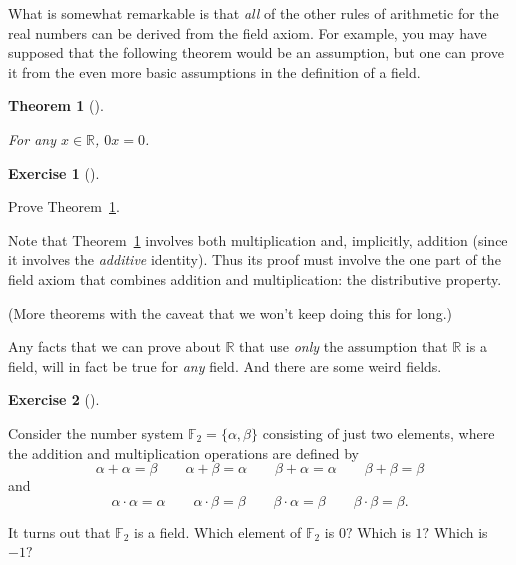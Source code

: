 \documentclass[
  letterpaper,
  DIV=11,
  numbers=noendperiod]{scrreprt}
\def\R{\mathbb R}
\theoremstyle{plain}
\newtheorem{theorem}{Theorem}[chapter]
\theoremstyle{definition}
\newtheorem{exercise}{Exercise}[chapter]
\theoremstyle{plain}
\theoremstyle{plain}
\theoremstyle{definition}
\theoremstyle{definition}
\theoremstyle{remark}
\begin{document}
What is somewhat remarkable is that \emph{all} of the other rules of
arithmetic for the real numbers can be derived from the field axiom. For
example, you may have supposed that the following theorem would be an
assumption, but one can prove it from the even more basic assumptions in
the definition of a field.

\begin{theorem}[]\protect\hypertarget{thm-zero-times-x}{}\label{thm-zero-times-x}

For any \(x\in\R\), \(0x=0\).

\end{theorem}

\begin{exercise}[]\protect\hypertarget{exr-zero-times-x}{}\label{exr-zero-times-x}

Prove Theorem~\ref{thm-zero-times-x}.

\end{exercise}

\begin{tcolorbox}[enhanced jigsaw, titlerule=0mm, opacitybacktitle=0.6, leftrule=.75mm, bottomrule=.15mm, left=2mm, arc=.35mm, colback=white, rightrule=.15mm, colframe=quarto-callout-tip-color-frame, toptitle=1mm, breakable, opacityback=0, colbacktitle=quarto-callout-tip-color!10!white, bottomtitle=1mm, title=\textcolor{quarto-callout-tip-color}{\faLightbulb}\hspace{0.5em}{Hint}, coltitle=black, toprule=.15mm]

Note that Theorem~\ref{thm-zero-times-x} involves both multiplication
and, implicitly, addition (since it involves the \emph{additive}
identity). Thus its proof must involve the one part of the field axiom
that combines addition and multiplication: the distributive property.

\end{tcolorbox}

(More theorems with the caveat that we won't keep doing this for long.)

Any facts that we can prove about \(\R\) that use \emph{only} the
assumption that \(\R\) is a field, will in fact be true for \emph{any}
field. And there are some weird fields.

\begin{exercise}[]\protect\hypertarget{exr-z2-is-a-field}{}\label{exr-z2-is-a-field}

Consider the number system \(\mathbb{F}_2=\{\alpha,\beta\}\) consisting
of just two elements, where the addition and multiplication operations
are defined by
\[\alpha+\alpha=\beta \qquad \alpha+\beta=\alpha \qquad \beta+\alpha=\alpha \qquad \beta+\beta=\beta\]
and
\[\alpha\cdot\alpha=\alpha \qquad \alpha\cdot\beta=\beta \qquad \beta\cdot\alpha=\beta \qquad \beta\cdot\beta=\beta.\]

It turns out that \(\mathbb{F}_2\) is a field. Which element of
\(\mathbb{F}_2\) is \(0?\) Which is \(1?\) Which is \(-1?\)

\end{exercise}
\end{document}
